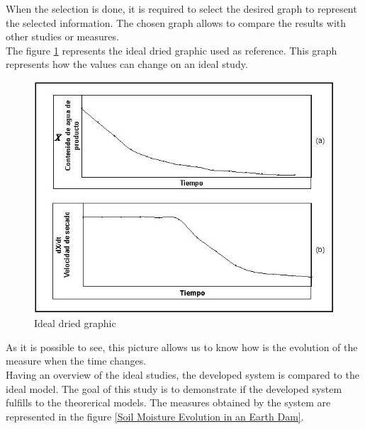 When the selection is done, it is required to select the desired graph to represent the selected information. The chosen graph allows to compare the results with other studies or measures.\\

The figure \ref{Ideal dried graphic} \cite{secado_ideal} represents the ideal dried graphic used as reference. This graph represents how the values can change on an ideal study.\\

\begin{figure}[H]
\begin{centering}
\includegraphics[scale=0.6]{IMGS/secado_ideal.jpg}
\caption{Ideal dried graphic \label{Ideal dried graphic}}
\end{centering}
\end{figure}

As it is possible to see, this picture allows us to know how is the evolution of the measure when the time changes.\\

Having an overview of the ideal studies, the developed system is compared to the ideal model. The goal of this study is to demonstrate if the developed system fulfills to the theorerical models. The measures obtained by the system are represented in the figure \ref{Soil Moisture Evolution in an Earth Dam}.

